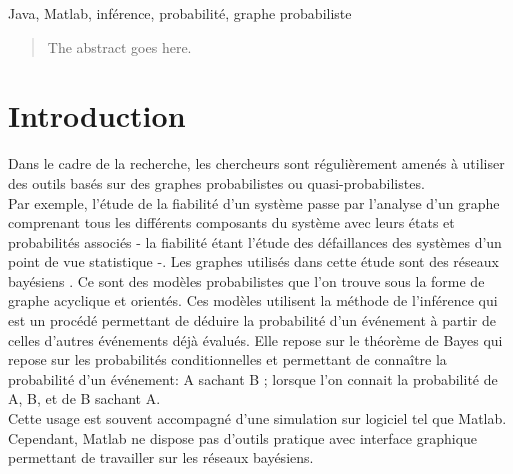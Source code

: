 \documentclass[conference]{IEEEtran}
\begin{document}




\maketitle



\begin{center}
Java, Matlab, inférence, probabilité, graphe probabiliste
\end{center}

\begin{abstract}
The abstract goes here.

\cite{murphyk}
\end{abstract}





%
\IEEEpeerreviewmaketitle


\section{Introduction}

Dans le cadre de la recherche, les chercheurs sont régulièrement amenés à utiliser des outils basés sur des graphes probabilistes ou quasi-probabilistes.\\
Par exemple, l'étude de la fiabilité d'un système passe par l'analyse d'un graphe comprenant tous les différents composants du système avec leurs états et probabilités associés - la fiabilité étant l'étude des défaillances des systèmes d'un point de vue statistique -. Les graphes utilisés dans cette étude sont des réseaux bayésiens \cite{kmurphy} \cite{Smail}. Ce sont des modèles probabilistes que l'on trouve sous la forme de graphe acyclique et orientés. Ces modèles utilisent la méthode de l'inférence qui est un procédé permettant de déduire la probabilité d'un événement à partir de celles d'autres événements déjà évalués. Elle repose sur le théorème de Bayes qui repose sur les probabilités conditionnelles et permettant de connaître la probabilité d'un événement:  A sachant B ; lorsque l'on connait la probabilité de A, B, et de B sachant A. \\
Cette usage est souvent accompagné d'une simulation sur logiciel tel que Matlab. Cependant, Matlab ne dispose pas d'outils pratique avec interface graphique permettant de travailler sur les réseaux bayésiens. \\
\end{document}
